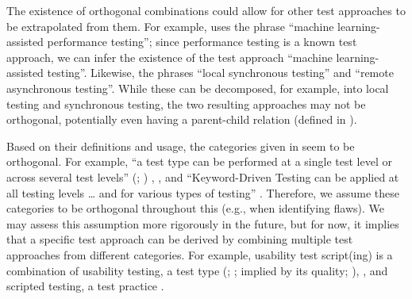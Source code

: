 The existence of orthogonal combinations could allow for other test
approaches to be extrapolated from them. For example, \citet{Moghadam2019}
uses the phrase ``machine learning-assisted performance testing''; since
performance testing is a known test approach, we can infer the existence
of the test approach ``machine learning-assisted testing''. Likewise,
\citet{JardEtAl1999}  the phrases ``local synchronous
testing'' and ``remote asynchronous testing''. While these can be
decomposed, for example, into local testing and synchronous testing,
the two resulting approaches may not be orthogonal, potentially even having
a parent-child relation (defined in ).

Based on their definitions and usage, the categories given in
 seem to be orthogonal. For example, ``a test type can be
performed at a single test level or across several test levels''
\ifnotpaper
    (\citealp[p.~15]{IEEE2022}; \citeyear[p.~7]{IEEE2021})%
\else
    \cite[p.~15]{IEEE2022}, \cite[p.~7]{IEEE2021}%
\fi, and ``Keyword-Driven Testing can be applied at all testing levels
\dots{} and for various types of testing'' \citeyearpar[p.~4]{IEEE2016}.
Therefore, we assume these categories to be orthogonal throughout this
\docType{} (e.g., when identifying flaws). We may assess this assumption more
rigorously in the future, but for now, it
implies that a specific test approach can be derived by combining multiple
test approaches from different categories. For example, usability test
script(ing) \citepISTQB{} is a combination of usability testing, a test type
\ifnotpaper (\citealp[pp.~22, 26--27]{IEEE2022};
    \citeyear[pp.~7, 40, Tab.~A.1]{IEEE2021}; implied by its quality;
    \citealp[p.~53]{Firesmith2015})\else \cite[pp.~22, 26--27]{IEEE2022},
    \cite[pp.~7, 40, Tab.~A.1]{IEEE2021}\fi, and scripted testing, a test
practice \citep[pp.~20, 22\ifnotpaper; implied by p.~33\fi]{IEEE2022}.

